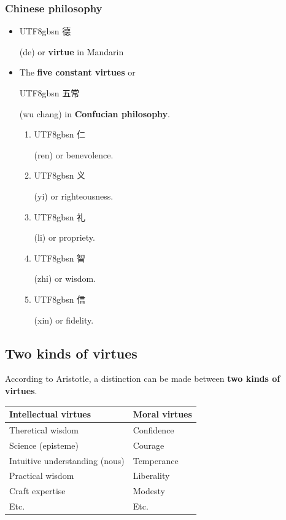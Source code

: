 \documentclass[11pt]{article}
\begin{document}
\subsubsection{Chinese philosophy}
\label{sec:orgfae4c64}
\begin{itemize}
\item \begin{CJK*}{UTF8}{gbsn} 德 \end{CJK*} (de) or \textbf{virtue} in Mandarin
\item The \textbf{five constant virtues} or  \begin{CJK*}{UTF8}{gbsn} 五常 \end{CJK*} (wu chang) in \textbf{Confucian philosophy}.
\begin{enumerate}
\item \begin{CJK*}{UTF8}{gbsn} 仁 \end{CJK*} (ren) or benevolence.
\item \begin{CJK*}{UTF8}{gbsn} 义 \end{CJK*} (yi) or righteousness.
\item \begin{CJK*}{UTF8}{gbsn} 礼 \end{CJK*} (li) or propriety.
\item \begin{CJK*}{UTF8}{gbsn} 智 \end{CJK*} (zhi) or wisdom.
\item \begin{CJK*}{UTF8}{gbsn} 信 \end{CJK*} (xin) or fidelity.
\end{enumerate}
\end{itemize}
\subsection{Two kinds of virtues}
\label{sec:orgfc21789}
According to Aristotle, a distinction can be made between \textbf{two kinds of virtues}.

\begin{center}
\begin{tabularx}{\textwidth}{X|X}
Intellectual virtues & Moral virtues\\
\hline
Theretical wisdom & Confidence\\
Science (episteme) & Courage\\
Intuitive understanding (nous) & Temperance\\
Practical wisdom & Liberality\\
Craft expertise & Modesty\\
Etc. & Etc.\\
\end{tabularx}
\end{center}
\end{document}
